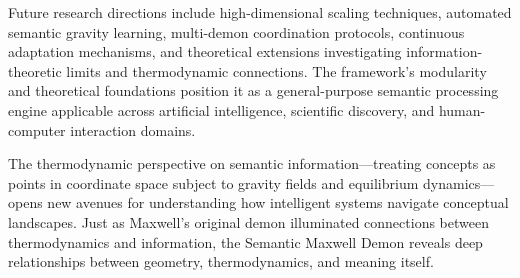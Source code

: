 \documentclass[12pt,a4paper]{article}
\begin{document}
Future research directions include high-dimensional scaling techniques, automated semantic gravity learning, multi-demon coordination protocols, continuous adaptation mechanisms, and theoretical extensions investigating information-theoretic limits and thermodynamic connections. The framework's modularity and theoretical foundations position it as a general-purpose semantic processing engine applicable across artificial intelligence, scientific discovery, and human-computer interaction domains.

The thermodynamic perspective on semantic information—treating concepts as points in coordinate space subject to gravity fields and equilibrium dynamics—opens new avenues for understanding how intelligent systems navigate conceptual landscapes. Just as Maxwell's original demon illuminated connections between thermodynamics and information, the Semantic Maxwell Demon reveals deep relationships between geometry, thermodynamics, and meaning itself.



\end{document}
